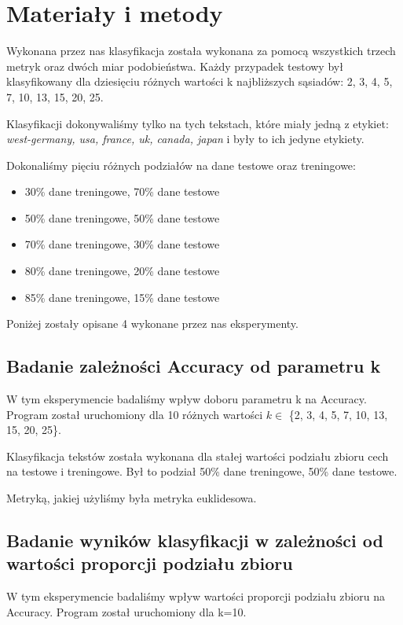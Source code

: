 \documentclass{classrep}
\begin{document}
\newpage
\section{Materiały i metody} %
Wykonana przez nas klasyfikacja została wykonana za pomocą wszystkich trzech metryk oraz dwóch miar podobieństwa. Każdy przypadek testowy był klasyfikowany dla dziesięciu różnych wartości k najbliższych sąsiadów: 2, 3, 4, 5, 7, 10, 13, 15, 20, 25.

Klasyfikacji dokonywaliśmy tylko na tych tekstach, które miały jedną z etykiet: \textsl{west-germany, usa, france, uk, canada, japan} i były to ich jedyne etykiety.

Dokonaliśmy pięciu różnych podziałów na dane testowe oraz treningowe:
\begin{itemize}
\item 30\% dane treningowe, 70\% dane testowe
\item 50\% dane treningowe, 50\% dane testowe
\item 70\% dane treningowe, 30\% dane testowe
\item 80\% dane treningowe, 20\% dane testowe
\item 85\% dane treningowe, 15\% dane testowe
\end{itemize}

Poniżej zostały opisane 4 wykonane przez nas eksperymenty.

\subsection{Badanie zależności Accuracy od parametru k}

W tym eksperymencie badaliśmy wpływ doboru parametru k na Accuracy. Program został uruchomiony dla 10 różnych wartości $k\in$ \{2, 3, 4, 5, 7, 10, 13, 15, 20, 25\}.

Klasyfikacja tekstów została wykonana dla stałej wartości podziału zbioru cech na testowe i treningowe. Był to podział 50\% dane treningowe, 50\% dane testowe.

Metryką, jakiej użyliśmy była metryka euklidesowa.

\subsection{Badanie wyników klasyfikacji w zależności od wartości proporcji podziału zbioru}

W tym eksperymencie badaliśmy wpływ wartości proporcji podziału zbioru na Accuracy. Program został uruchomiony dla k=10.
\end{document}
